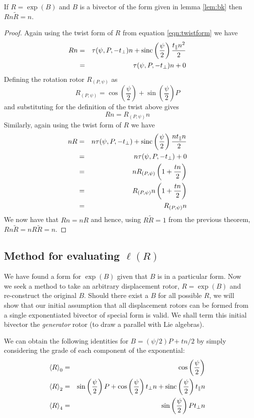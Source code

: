 \begin{thm} If $R = \exp(B)$ and $B$ is a bivector of the form 
given in lemma
\ref{lem:bk} then $Rn\tilde{R} = n$.
\end{thm}
\begin{proof}
Again using the twist form of $R$ from equation \ref{eqn:twistform} we have
\begin{eqnarray*}
Rn & = & \tau(\psi, P, - t_\perp)n + 
\mathrm{sinc}\left(\frac{\psi}{2}\right)\frac{t_\parallel n^2}{2} \\
&=& \tau(\psi, P, - t_\perp)n + 0
\end{eqnarray*}
Defining the rotation rotor $R_{(P,\psi)}$ as
\[
R_{(P,\psi)} = \cos\left(\frac{\psi}{2}\right) +
   \sin\left(\frac{\psi}{2}\right)P
\]
and substituting for the definition of the twist above gives
\[
Rn = R_{(P,\psi)} n
\]
Similarly, again using the twist form of $R$ we have
\begin{eqnarray*}
nR & = & n\tau(\psi, P, - t_\perp) + 
\mathrm{sinc}\left(\frac{\psi}{2}\right)\frac{nt_\parallel n}{2} \\
&=& n\tau(\psi, P, - t_\perp) + 0 \\
&=& n R_{(P,\psi)} \left( 1 + \frac{tn}{2} \right) \\
&=& R_{(P,\psi)} n \left( 1 + \frac{tn}{2} \right) \\
&=& R_{(P,\psi)} n 
\end{eqnarray*}
We now have that $Rn = nR$ and hence, using
$R\tilde{R} = 1$ from the previous theorem, 
$Rn\tilde{R} = nR\tilde{R} = n$.
\end{proof}

\subsection{Method for evaluating $\ell(R)$}

We have found a form for $\exp(B)$ given that $B$ is in a particular form.
Now we seek a method to take an arbitrary displacement
rotor, $R = \exp(B)$ and re-construct the original $B$. Should there exist
a $B$ for all possible $R$, we will show that our initial assumption
that all displacement rotors can be formed from a single exponentiated bivector
of special form is valid. We shall term this initial bivector
the \emph{generator} rotor (to draw a parallel with Lie algebras).

We can obtain the following identities for $B=(\psi / 2) P + tn / 2$ by simply considering
the grade of each component of the exponential:
\begin{eqnarray*}
\left< R \right>_0 & = & \cos\left(\frac{\psi}{2}\right) \\
\left< R \right>_2 & = & \sin\left(\frac{\psi}{2}\right) P + 
  \cos\left(\frac{\psi}{2}\right) t_\perp n + \mathrm{sinc}\left(\frac{\psi}{2}\right) t_\parallel n \\
\left< R \right>_4 & = & \sin\left(\frac{\psi}{2}\right) Pt_\perp n
\end{eqnarray*}


